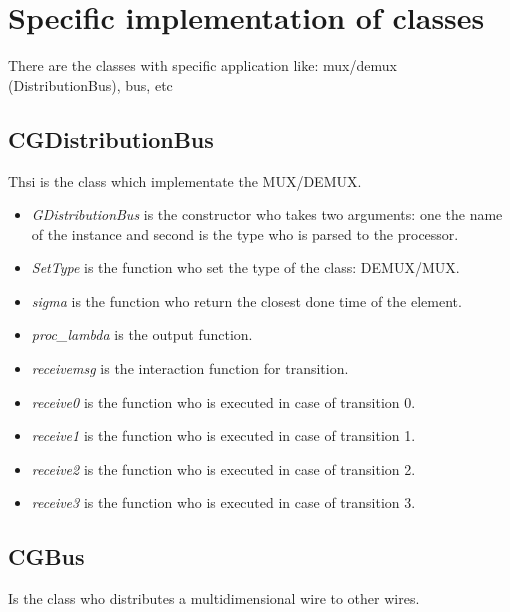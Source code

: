 \documentclass[a4paper,oneside,notitlepage]{article}
\begin{document}
\section{Specific implementation of classes}

There are the classes with specific application like: mux/demux
(DistributionBus), bus, etc

\subsection{CGDistributionBus}

Thsi is the class which implementate the MUX/DEMUX.

\begin{itemize}
\item \textit{GDistributionBus} is the constructor who takes two arguments:
one the name of the instance and second is the type who is parsed to the
processor.

\item \textit{SetType} is the function who set the type of the class:
DEMUX/MUX.

\item \textit{sigma} is the function who return the closest done time of the
element.

\item \textit{proc\_lambda} is the output function.

\item \textit{receivemsg} is the interaction function for transition.

\item \textit{receive0} is the function who is executed in case of
transition 0.

\item \textit{receive1} is the function who is executed in case of
transition 1.

\item \textit{receive2} is the function who is executed in case of
transition 2.

\item \textit{receive3} is the function who is executed in case of
transition 3.
\end{itemize}

\subsection{CGBus}

Is the class who distributes a multidimensional wire to other wires.
\end{document}
